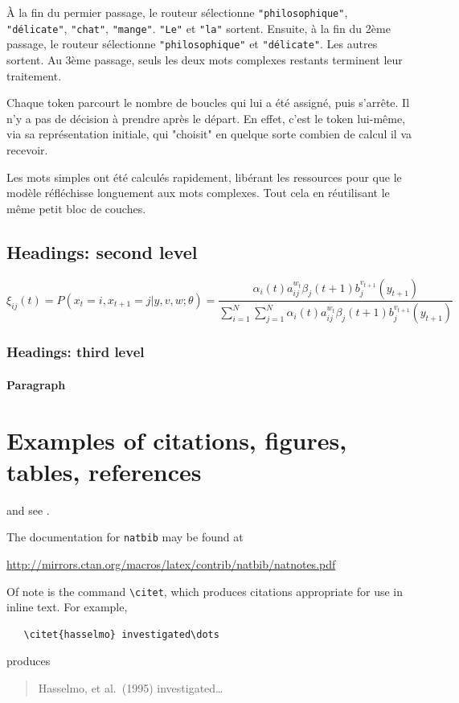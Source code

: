 \documentclass{article}
\begin{document}
 À la fin du permier passage, le routeur sélectionne \texttt{"philosophique"},
 \texttt{"délicate"}, \texttt{"chat"}, \texttt{"mange"}. \texttt{"Le"}
 et \texttt{"la"} sortent. Ensuite, à la fin du 2ème passage, le routeur
 sélectionne \texttt{"philosophique"} et \texttt{"délicate"}.
 Les autres sortent. Au 3ème passage, seuls les deux mots complexes restants
 terminent leur traitement.

 Chaque token parcourt le nombre de boucles qui lui a été assigné,
 puis s'arrête. Il n'y a pas de décision à prendre après le départ.
 En effet, c'est le token lui-même, via sa représentation initiale,
 qui "choisit" en quelque sorte combien de calcul il va recevoir.

Les mots simples ont été calculés rapidement, libérant les ressources
pour que le modèle réfléchisse longuement aux mots complexes.
Tout cela en réutilisant le même petit bloc de couches.






\subsection{Headings: second level}
\lipsum[5]
\begin{equation}
\xi _{ij}(t)=P(x_{t}=i,x_{t+1}=j|y,v,w;\theta)= {\frac {\alpha _{i}(t)a^{w_t}_{ij}\beta _{j}(t+1)b^{v_{t+1}}_{j}(y_{t+1})}{\sum _{i=1}^{N} \sum _{j=1}^{N} \alpha _{i}(t)a^{w_t}_{ij}\beta _{j}(t+1)b^{v_{t+1}}_{j}(y_{t+1})}}
\end{equation}

\subsubsection{Headings: third level}
\lipsum[6]

\paragraph{Paragraph}
\lipsum[7]

\section{Examples of citations, figures, tables, references}
\label{sec:others}
\lipsum[8] \cite{kour2014real,kour2014fast} and see \cite{hadash2018estimate}.

The documentation for \verb+natbib+ may be found at
\begin{center}
  \url{http://mirrors.ctan.org/macros/latex/contrib/natbib/natnotes.pdf}
\end{center}
Of note is the command \verb+\citet+, which produces citations
appropriate for use in inline text.  For example,
\begin{verbatim}
   \citet{hasselmo} investigated\dots
\end{verbatim}
produces
\begin{quote}
  Hasselmo, et al.\ (1995) investigated\dots
\end{quote}
\end{document}
